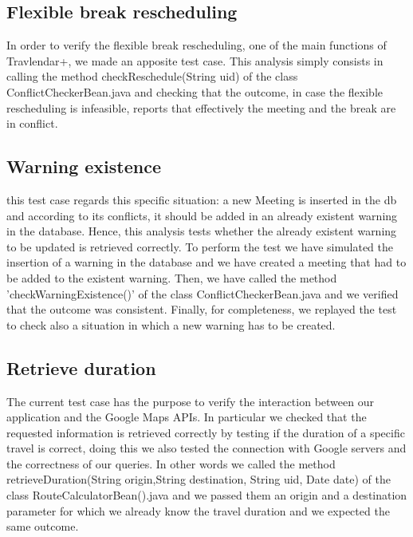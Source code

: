 \subsection{Flexible break rescheduling}
In order to verify the flexible break rescheduling, one of the main functions of Travlendar+, we made an apposite test case. This analysis simply consists in calling the method checkReschedule(String uid) of the class ConflictCheckerBean.java and checking that the outcome, in case the flexible rescheduling is infeasible, reports that effectively the meeting and the break are in conflict. 

\subsection{Warning existence }
this test case regards this specific situation: a new Meeting is inserted in the db and according to its conflicts, it should be added in an already existent warning in the database.  Hence, this analysis tests whether the already existent warning to be updated is retrieved correctly. To perform the test we have simulated the insertion of a warning in the database and we have created a meeting that had to be added to the existent warning. Then, we have called the method 'checkWarningExistence()' of the class ConflictCheckerBean.java and we verified that the outcome was consistent. 
Finally, for completeness, we replayed the test to check also a situation in which a new warning has to be created. 

\subsection{Retrieve duration}
The current test case has the purpose to verify the interaction between our application and the Google Maps APIs. In particular we checked that the requested information is retrieved correctly by testing if the duration of a specific travel is correct, doing this we also tested the connection with Google servers and the correctness of our queries. 
In other words we called the method retrieveDuration(String origin,String destination, String uid, Date date)  of the class RouteCalculatorBean().java and we passed them an origin and a destination parameter for which we already know the travel duration and we expected the same outcome. 
